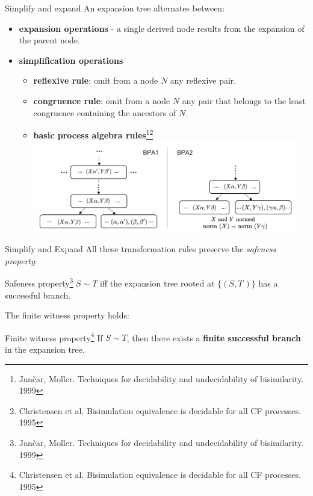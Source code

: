 \documentclass[10pt]{beamer}
\begin{document}
\begin{frame} {Simplify and expand}
	An expansion tree alternates between:
	\vspace*{-1mm}
	\begin{itemize} 
		\item {\color{mLightBrown} \bf expansion operations} - a single derived node results from the expansion of the parent node. \pause
		\item {\color{teal}\bf simplification operations	}
		\begin{itemize}
			\item {\bf reflexive rule}: omit from a node $N$ any reflexive pair.
			\item {\bf congruence rule}: omit from a node $N$ any pair that belongs to the least congruence containing the ancestors of $N$. \pause
			\item {\bf basic process algebra rules}\footnote{Jan{\v{c}}ar, Moller. Techniques for decidability and undecidability of bisimilarity. 1999}\footnote{ Christensen et al. Bisimulation equivalence is decidable for all CF processes. 1995}\\
			\vspace*{-2mm}
			\hspace*{-2cm}\includegraphics[height=4cm]{img/bpa_new}\smallskip
		\end{itemize}
	\end{itemize}
\end{frame}

\begin{frame}{Simplify and Expand}
	All these transformation rules preserve the \emph{safeness property}:
	\begin{block}{Safeness property\footnote{Jan{\v{c}}ar, Moller. Techniques for decidability and undecidability of bisimilarity. 1999}}
		\smallskip
		$S\sim T$ iff the expansion tree rooted at $\{(S,T\,)\}$ has a successful branch.	
	\end{block}
	
	The finite witness property holds\footnotemark[\value{footnote}]:
	
	\begin{block}{Finite witness property\footnotemark[\value{footnote}]\footnote{ Christensen et al. Bisimulation equivalence is decidable for all CF processes. 1995}}
		\smallskip
		If $S\sim T$, then there exists a {\bf finite successful branch} in the expansion tree.
	\end{block}
\end{frame}
\end{document}
